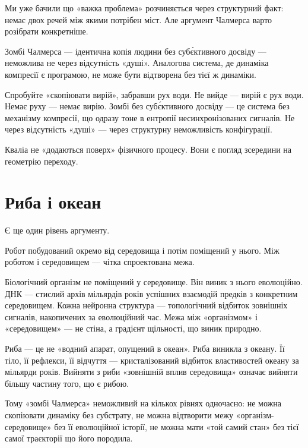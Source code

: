 \documentclass[12pt, a4paper, openany]{book}
\begin{document}
Ми уже бачили що «важка проблема» розчиняється через структурний факт: немає двох речей між якими потрібен міст. Але аргумент Чалмерса варто розібрати конкретніше.

Зомбі Чалмерса --- ідентична копія людини без суб\'єктивного досвіду --- неможлива не через відсутність «душі». Аналогова система, де динаміка компресії є програмою, не може бути відтворена без тієї ж динаміки.

\begin{analogybox}
Спробуйте «скопіювати вирій», забравши рух води. Не вийде --- вирій є рух води. Немає руху --- немає вирію. Зомбі без суб\'єктивного досвіду --- це система без механізму компресії, що одразу тоне в ентропії несинхронізованих сигналів. Не через відсутність «душі» --- через структурну неможливість конфігурації.
\end{analogybox}

Кваліа не «додаються поверх» фізичного процесу. Вони є погляд зсередини на геометрію переходу.

\section{Риба і океан}

Є ще один рівень аргументу.

Робот побудований окремо від середовища і потім поміщений у нього. Між роботом і середовищем --- чітка спроектована межа.

Біологічний організм не поміщений у середовище. Він виник з нього еволюційно. ДНК --- стислий архів мільярдів років успішних взаємодій предків з конкретним середовищем. Кожна нейронна структура --- топологічний відбиток зовнішніх сигналів, накопичених за еволюційний час. Межа між «організмом» і «середовищем» --- не стіна, а градієнт щільності, що виник природно.

\begin{analogybox}
Риба --- це не «водний апарат, опущений в океан». Риба виникла з океану. Її тіло, її рефлекси, її відчуття --- кристалізований відбиток властивостей океану за мільярди років. Вийняти з риби «зовнішній вплив середовища» означає вийняти більшу частину того, що є рибою.
\end{analogybox}

Тому «зомбі Чалмерса» неможливий на кількох рівнях одночасно: не можна скопіювати динаміку без субстрату, не можна відтворити межу «організм-середовище» без її еволюційної історії, не можна мати «той самий стан» без тієї самої траєкторії що його породила.
\end{document}

